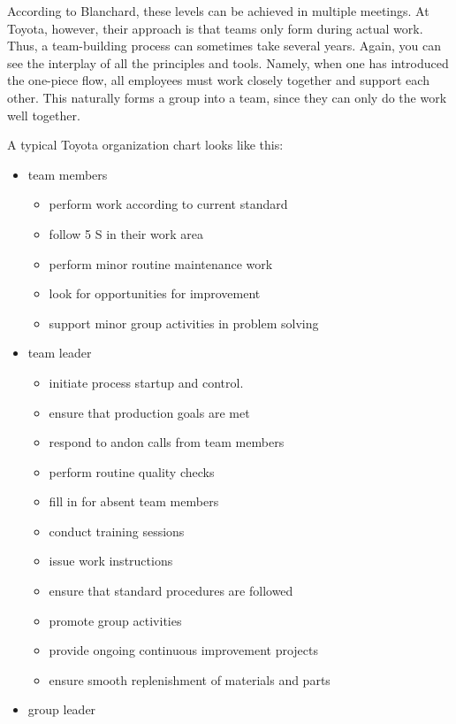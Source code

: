 \documentclass[a4paper,12pt]{scrartcl}
\begin{document}
According to Blanchard, these levels can be achieved in multiple meetings. At Toyota, however, their approach is that teams only form during actual work. Thus, a team-building process can sometimes take several years. Again, you can see the interplay of all the principles and tools. Namely, when one has introduced the one-piece flow, all employees must work closely together and support each other. This naturally forms a group into a team, since they can only do the work well together.

A typical Toyota organization chart looks like this:

\begin{itemize}
    \item team members
    \begin{itemize}
        \item perform work according to current standard
        \item follow 5 S in their work area
        \item perform minor routine maintenance work
        \item look for opportunities for improvement
        \item support minor group activities in problem solving
    \end{itemize}
    \item team leader
        \begin{itemize}
        \item initiate process startup and control.
        \item ensure that production goals are met
        \item respond to andon calls from team members
        \item perform routine quality checks
        \item fill in for absent team members
        \item conduct training sessions
        \item issue work instructions
        \item ensure that standard procedures are followed
        \item promote group activities
        \item provide ongoing continuous improvement projects
        \item ensure smooth replenishment of materials and parts
    \end{itemize}
    \item group leader
        \begin{itemize}

\end{itemize}
\end{itemize}
\end{document}
